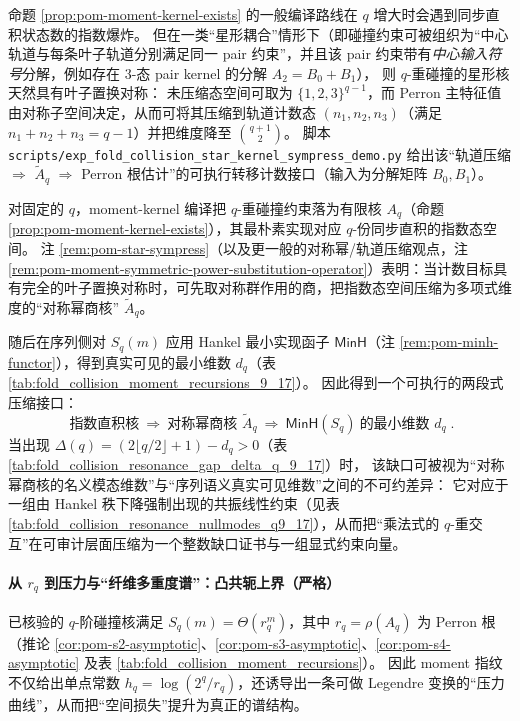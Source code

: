 \begin{remark}\label{rem:pom-star-sympress}
命题 \ref{prop:pom-moment-kernel-exists} 的一般编译路线在 \(q\) 增大时会遇到同步直积状态数的指数爆炸。
但在一类“星形耦合”情形下（即碰撞约束可被组织为“中心轨道与每条叶子轨道分别满足同一 pair 约束”，并且该 pair 约束带有\emph{中心输入符号}分解，例如存在 \(3\)-态 pair kernel 的分解 \(A_2=B_0+B_1\)），
则 \(q\)-重碰撞的星形核天然具有叶子置换对称：
未压缩态空间可取为 \(\{1,2,3\}^{q-1}\)，而 Perron 主特征值由对称子空间决定，从而可将其压缩到轨道计数态
\((n_1,n_2,n_3)\)（满足 \(n_1+n_2+n_3=q-1\)）并把维度降至
\(\binom{q+1}{2}\)。
脚本 \texttt{scripts/exp\_fold\_collision\_star\_kernel\_sympress\_demo.py} 给出该“轨道压缩 \(\Rightarrow\) \(\widetilde A_q\) \(\Rightarrow\) Perron 根估计”的可执行转移计数接口（输入为分解矩阵 \(B_0,B_1\)）。
\end{remark}

\begin{remark}\label{rem:pom-sympower-then-minh}
对固定的 \(q\)，moment-kernel 编译把 \(q\)-重碰撞约束落为有限核 \(A_q\)（命题 \ref{prop:pom-moment-kernel-exists}），其最朴素实现对应 \(q\)-份同步直积的指数态空间。
注 \ref{rem:pom-star-sympress}（以及更一般的对称幂/轨道压缩观点，注 \ref{rem:pom-moment-symmetric-power-substitution-operator}）表明：当计数目标具有完全的叶子置换对称时，可先取对称群作用的商，把指数态空间压缩为多项式维度的“对称幂商核” \(\widetilde A_q\)。
\par
随后在序列侧对 \(S_q(m)\) 应用 Hankel 最小实现函子 \(\mathsf{MinH}\)（注 \ref{rem:pom-minh-functor}），得到真实可见的最小维数 \(d_q\)（表 \ref{tab:fold_collision_moment_recursions_9_17}）。
因此得到一个可执行的两段式压缩接口：
\[
\boxed{\;
\text{指数直积核}\ \Longrightarrow\ \text{对称幂商核 }\widetilde A_q\ \Longrightarrow\ \mathsf{MinH}(S_q)\ \text{的最小维数 }d_q\; }.
\]
当出现 \(\Delta(q)=(2\lfloor q/2\rfloor+1)-d_q>0\)（表 \ref{tab:fold_collision_resonance_gap_delta_q_9_17}）时，
该缺口可被视为“对称幂商核的名义模态维数”与“序列语义真实可见维数”之间的不可约差异：
它对应于一组由 Hankel 秩下降强制出现的共振线性约束（见表 \ref{tab:fold_collision_resonance_nullmodes_q9_17}），从而把“乘法式的 \(q\)-重交互”在可审计层面压缩为一个整数缺口证书与一组显式约束向量。
\end{remark}

\paragraph{从 \texorpdfstring{$r_q$}{r\_q} 到压力与“纤维多重度谱”：凸共轭上界（严格）}
已核验的 \(q\)-阶碰撞核满足 \(S_q(m)=\Theta(r_q^m)\)，其中 \(r_q=\rho(A_q)\) 为 Perron 根（推论 \ref{cor:pom-s2-asymptotic}、\ref{cor:pom-s3-asymptotic}、\ref{cor:pom-s4-asymptotic} 及表 \ref{tab:fold_collision_moment_recursions}）。
因此 moment 指纹不仅给出单点常数 \(h_q=\log(2^q/r_q)\)，还诱导出一条可做 Legendre 变换的“压力曲线”，从而把“空间损失”提升为真正的谱结构。

